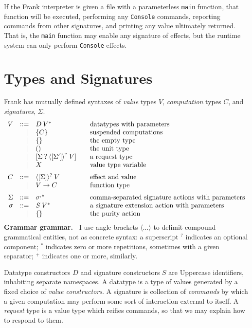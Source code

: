 \documentclass{article}
\begin{document}
If the Frank interpreter is given a file with a parameterless \texttt{main} function, that function will be executed, performing any \texttt{Console} commands, reporting commands from other signatures, and printing any value ultimately returned. That is, the \texttt{main} function may enable any signature of effects, but the runtime system can only perform \texttt{Console} effects.


\section{Types and Signatures}

Frank has mutually defined syntaxes of \emph{value} types $V$, \emph{computation} types $C$, and \emph{signatures}, $\Sigma$.
\[\begin{array}{rrl@{\qquad}l}
V & ::= & D\:V^\ast & \mbox{datatypes with parameters} \\
   & | & \{C\} & \mbox{suspended computations} \\
   & | & \{\} & \mbox{the empty type} \\
   & | & ()  & \mbox{the unit type} \\
   & | & [\Sigma\:?\:\langle[\Sigma']\rangle^?\:V] & \mbox{a request type}\\
   & | & X & \mbox{value type variable}
\medskip \\
C & ::= & \langle[\Sigma]\rangle^?\:V & \mbox{effect and value}\\
   & | & V \to C & \mbox{function type}
\medskip \\
\Sigma & ::= & \sigma^{,\ast} &
    \mbox{comma-separated signature actions with parameters} \\
\sigma & ::= & S\:V^\ast & \mbox{a signature extension action with parameters} \\
         & | & \{\} & \mbox{the purity action}
\end{array}\]
\textbf{Grammar grammar.~} I use angle brackets \(\langle\ldots\rangle\) to delimit compound grammatical entities, not as concrete syntax: a superscript \({}^?\) indicates an optional component; \({}^*\) indicates zero or more repetitions, sometimes with a given separator; \({}^+\) indicates one or more, similarly.

Datatype constructors \(D\) and signature constructors \(S\) are Uppercase identifiers, inhabiting separate namespaces. A datatype is a type of values generated by a fixed choice of \emph{value constructors}.
A signature is collection of \emph{commands} by which a given computation may perform some sort of interaction external to itself.
A \emph{request} type is a value type which reifies commands, so that we may explain how to respond to them.
\end{document}
